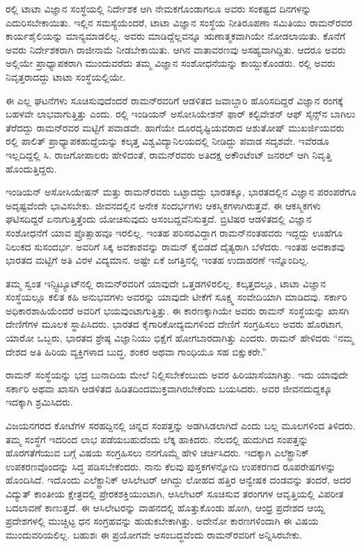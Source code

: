 ರಲ್ಲಿ ಟಾಟಾ ವಿಜ್ಞಾನ ಸಂಸ್ಥೆಯಲ್ಲಿ ನಿರ್ದೇಶಕ ಆಗಿ ನೇಮಕಗೊಂಡಾಗಲೂ ಅವರು ಸಂಕಷ್ಟದ ದಿನಗಳನ್ನು ಎದುರಿಸಬೇಕಾಯಿತು. ಇಲ್ಲಿನ ಸಮಸ್ಯೆಯೆಂದರೆ, ಟಾಟಾ ವಿಜ್ಞಾನ ಸಂಸ್ಥೆಯ ನೀತಿರೂಪಣಾ ಸಮಿತಿಯು ರಾಮನ್‍ರವರ ಕಾರ್ಯಶೈಲಿಯನ್ನು ಮಾನ್ಯಮಾಡಲಿಲ್ಲ. ಅವರು ಮಾಡಿದ್ದೆಲ್ಲವನ್ನೂ ಋಣಾತ್ಮಕವಾಗಿಯೇ ನೋಡಲಾಯಿತು. ಕೊನೆಗೆ ಅವರು ನಿರ್ದೇಶಕರಾಗಿ ರಾಜೀನಾಮೆ ನೀಡಬೇಕಾಯಿತು. ಆಗಿನ ವಾತಾವರಣವು ಅಸಹ್ಯವಾಗಿದ್ದಿತು. ಆದರೂ ಅವರು ಅಲ್ಲಿಯೇ ಪ್ರಾಧ್ಯಾಪಕರಾಗಿ ಮುಂದುವರೆದು ತಮ್ಮ ವಿಜ್ಞಾನ ಸಂಶೋಧನೆಯನ್ನು ಕಾಯ್ದುಕೊಂಡರು. ರಲ್ಲಿ ಅವರು ನಿವೃತ್ತರಾದದ್ದು ಟಾಟಾ ಸಂಸ್ಥೆಯಲ್ಲಿಯೇ.

ಈ ಎಲ್ಲ ಘಟನೆಗಳು ಸೂಚಿಸುವುದೆಂದರೆ ರಾಮನ್‍ರವರಿಗೆ ಆಡಳಿತದ ಜವಾಬ್ದಾರಿ ಹೊರಿಸದಿದ್ದರೆ ವಿಜ್ಞಾನ ರಂಗಕ್ಕೆ ಬಹಳವೇ ಲಾಭವಾಗುತ್ತಿತ್ತು ಎಂದು. ರಲ್ಲಿ ಇಂಡಿಯನ್ ಅಸೋಸಿಯೇಶನ್ ಫಾರ್ ಕಲ್ಟಿವೇಶನ್ ಆಫ್ ಸೈನ್ಸ್‌ನ ಬಾಗಿಲು ತೆರೆದದ್ದು ರಾಮನ್‍ರವರ ಮಟ್ಟಿಗೆ ಪವಾಡವೇ. ಹಾಗೆಯೇ ದೂರದೃಷ್ಟಿಯವರಾದ ಆಶುತೋಷ್ ಮುಖರ್ಜಿಯವರು ರಲ್ಲಿ ಪಾಲಿತ್ ಪ್ರಾಧ್ಯಾಪಕ\break ಹುದ್ದೆಯನ್ನು ಕಲ್ಕತ್ತ ವಿಶ್ವವಿದ್ಯಾನಿಲಯದಲ್ಲಿ ನೀಡಿದ್ದು ಪವಾಡ ಸದೃಶವೇ. ಇವೆರಡೂ ಇಲ್ಲದಿದ್ದಲ್ಲಿ ಸಿ. ರಾಜಗೋಪಾಲರು ಹೇಳಿದಂತೆ, ರಾಮನ್‍ರವರು ಅತಿದಕ್ಷ ಅಕೌಂಟೆಂಟ್ ಜನರಲ್ ಆಗಿ ನಿವೃತ್ತಿ ಹೊಂದುತ್ತಿದ್ದರು.

ಇಂಡಿಯನ್ ಅಸೋಸಿಯೇಷನ್ ಮತ್ತು ರಾಮನ್‍ರವರು ಒಟ್ಟಾದದ್ದು ಭಾರತಕ್ಕೂ, ಭಾರತದಲ್ಲಿನ ವಿಜ್ಞಾನ ಪರಂಪರೆಗೂ ಅದೃಷ್ಟವೆಂದೇ ಭಾವಿಸಬೇಕು. ಜೀವನದಲ್ಲಿನ ಅನೇಕ ಸಂದರ್ಭಗಳು ಆಕಸ್ಮಿಕಗಳಾಗಿರುತ್ತವೆ. ಈ ಆಕಸ್ಮಿಕಗಳು ಘಟಿಸದಿದ್ದರೆ ಏನಾಗುತ್ತಿತ್ತೆಂದು ಯೋಚಿಸುವುದು ಅಸಂಬದ್ದ\-ವೆನಿಸುತ್ತದೆ. ಬ್ರಿಟಿಷರ ಆಡಳಿತದಲ್ಲಿ ವಿಜ್ಞಾನ ಸಂಶೋಧನೆಗೆ ಯಾವ ಪ್ರೊತ್ಸಾಹವೂ ಇರಲಿಲ್ಲ. ಇಂತಹ ಪರಿಸರವಿದ್ದಾಗ ರಾಮನ್‌ನಂತಹವರು ಇದ್ದದ್ದು ಊಹೆಗೂ ನಿಲುಕದ ಸುಸಂದರ್ಭ. ಅವರಿಗೆ ಸಿಕ್ಕ ಅವಕಾಶವನ್ನು ರಾಮನ್ ಕೈಬಿಡದೆ ದೈತ್ಯರಾಗಿ ಬೆಳೆದರು. ಇಂತಹ ಅವಕಾಶವು ಭಾರತದ ಮಟ್ಟಿಗೆ ಅತಿ ವಿರಳ ವಿದ್ಯಮಾನ. ಅಷ್ಟೇ ಏಕೆ ಜಗತ್ತಿನಲ್ಲಿ ಇಂತಹ ಉದಾಹರಣೆ ಇನ್ನೊಂದಿಲ್ಲ.

ತಮ್ಮ ಸ್ವಂತ ಇನ್ಸ್ಟಿಟ್ಯೂಟ್‍ನಲ್ಲಿ ರಾಮನ್‍ರವರಿಗೆ ಯಾವುದೇ ಒತ್ತಡಗಳಿರಲಿಲ್ಲ. ಕಲ್ಕತ್ತದಲ್ಲೂ, ಟಾಟಾ ವಿಜ್ಞಾನ ಸಂಸ್ಥೆಯಲ್ಲೂ ಕಲಿತ ಕಹಿ ಅನುಭವಗಳು ಅವರನ್ನು ಯಾವುದೇ ಟೀಕೆಗೆ ಸೂಕ್ಷ್ಮ ಸಂವೇದಿಯಾಗಿ ಮಾಡಿದವು. ಸರ್ಕಾರಿ ಅಧಿಕಾರಶಾಹಿಯೆಂದರೆ ಅವರಿಗೆ ಭಯವುಂಟಾಗುತ್ತಿತ್ತು. ಈ ಕಾರಣಕ್ಕಾಗಿಯೇ ಅವರು ರಾಮನ್ ಸಂಸ್ಥೆಯನ್ನು ಖಾಸಗಿ ದೇಣಿಗೆಗಳ ಮೂಲಕ ಸ್ಥಾಪಿಸಿದರು. ಭಾರತದ ಕೈಗಾರಿಕೋದ್ಯಮಗಳಿಂದ ದೇಣಿಗೆ ಸಂಗ್ರಹಿಸಲು ಅವರು ಹೊರಟಾಗ, ಯಾರೋ ಒಬ್ಬರು, ಭಾರತದ ಶ್ರೇಷ್ಠ ವಿಜ್ಞಾನಿಯು ಭಿಕ್ಷೆಗೆ ಹೋಗಬಾರದಾಗಿತ್ತು ಎಂದರು. ರಾಮನ್ ಹೇಳಿದರು\enginline{-} “ನಮ್ಮ ದೇಶದ ಅತಿ ಹಿರಿಯ ವ್ಯಕ್ತಿಗಳಾದ ಬುದ್ಧ, ಶಂಕರ ಅಥವಾ ಗಾಂಧಿಯೂ ಸಹ ಬಿಕ್ಷುಕರೇ.”

\vskip 2pt

ರಾಮನ್ ಸಂಸ್ಥೆಯನ್ನು ಭದ್ರ ಬುನಾದಿಯ ಮೇಲೆ ನಿಲ್ಲಿಸಬೇಕೆಂಬುದು ಅವರ ಹಿರಿಯಾಸೆ\-ಯಾಗಿತ್ತು. ಇದು ಯಾವುದೇ ಸರ್ಕಾರಿ ಅಥವಾ ಖಾಸಗಿ ಆಡಳಿತದ ಹಿಡಿತದಿಂದ\break ಮುಕ್ತವಾಗಿರಬೇಕೆಂದು ಬಯಸಿದರು. ಅವರ ಜೀವನದುದ್ದಕ್ಕೂ ಇದಕ್ಕಾಗಿ ಶ್ರಮಿಸಿದರು.

\vskip 2pt

ವಿಜಯನಗರದ ಕೋಟೆಗಳ ಸರಹದ್ದಿನಲ್ಲಿ ಚಿನ್ನದ ಸಂಪತ್ತನ್ನು ಅಡಗಿಸಿಡಲಾಗಿದೆ ಎಂದು ಬಲ್ಲ ಮೂಲಗಳಿಂದ ತಿಳಿದರು. ತಮ್ಮ ಸಂಸ್ಥೆಗೆ ಇದರಿಂದ ಲಾಭ ಪಡೆಯಬಹುದೆಂದು ಲೆಕ್ಕ ಹಾಕಿದರು. ನೆಲದಲ್ಲಿ ಹುದುಗಿದ ಸಂಪತ್ತನ್ನು ಹೊರಗತೆಗೆಯುವ ಬಗ್ಗೆ ವಿಷಯ ಸಂಗ್ರಹಿಸಲು ನನಗೊಮ್ಮೆ ಹೇಳಿ ಚರ್ಚಿಸಿದರು. ಇದಕ್ಕಾಗಿ ಎಲೆಕ್ಟ್ರಾನಿಕ್ ಉಪಕರಣವೊಂದನ್ನು ಸಿದ್ಧ ಪಡಿಸಬೇಕೆಂದರು. ನಾನು ಕೆಲವು ಪುಸ್ತಕಗಳನ್ನೋದಿ ಉಪಕರಣದ ರೂಪರೇಷಗಳನ್ನು ಹೊಂದಿಸಿದೆ. ಇದೊಂದು ಎಲೆಕ್ಟ್ರಾನಿಕ್ ಆಸಿಲೇಟರ್ ಆಗಿದ್ದು ಲೋಹದ ಹತ್ತಿರ ಆನ್ವೇಷಕ ದಂಡವನ್ನು ತಂದರೆ, ಅದರ ವಿದ್ಯುತ್ ಕಾಂತೀಯ ಕ್ಷೇತ್ರದಲ್ಲಿ ಪ್ರೇರಕಶಕ್ತಿಯುಂಟಾಗಿ, ಆಸಿಲೇಟರ್ ಸೂಚಿಸುವ ತರಂಗಗಳ ಆವೃತ್ತಿಯಲ್ಲಿ ವಿಪರೀತ ಬದಲಾವಣೆ ಕಾಣುತ್ತದೆ. ಈ ಆಸಿಲೇಟರನ್ನು ವಾಹನದಲ್ಲಿ ಹೊತ್ತುಕೊಂಡು ಹೋಗಿ, ಆಂಧ್ರ ಪ್ರದೇಶದ ಆಯ್ದ ಪ್ರದೇಶಗಳಲ್ಲಿ ಮುಚ್ಚಿಟ್ಟ ಧನ ಸಂಗ್ರಹವನ್ನು ಹುಡುಕಬೇಕಾಗಿತ್ತು. ಅದೇನೋ ಕಾರಣಗಳಿಂದಾಗಿ ಈ ವಿಷಯ ಮುಂದುವರಿಯಲಿಲ್ಲ. ಬಹುಶಃ ಈ ಪ್ರಯೋಗವೇ ಅಸಂಬದ್ಧವೆಂದು ರಾಮನ್‍ರವರಿಗೆ ಅನ್ನಿಸಿರಬೇಕು.

